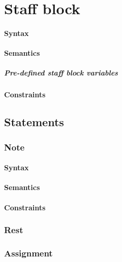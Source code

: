 \section{Staff block}
\paragraph{Syntax}

\paragraph{Semantics}

\subparagraph{Pre-defined staff block variables}

\paragraph{Constraints}

\subsection{Statements}
\subsubsection{Note }
\paragraph{Syntax}


\paragraph{Semantics}
\paragraph{Constraints}

\subsubsection{Rest }

\subsubsection{Assignment}


